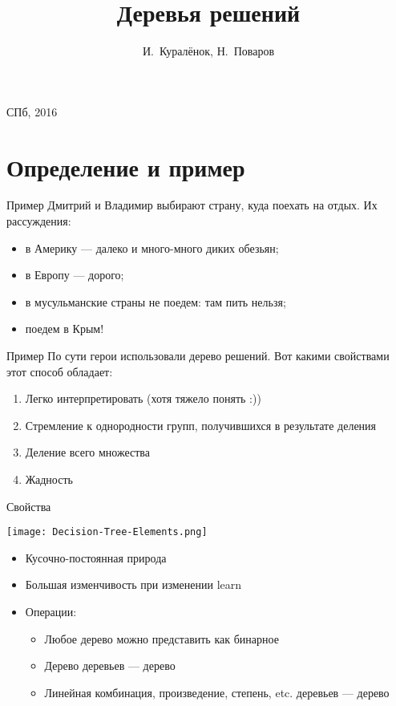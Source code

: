 \documentclass[14pt, fleqn, xcolor={dvipsnames, table}]{beamer}
\title{Деревья решений\\\small{}}
\author[]{\small{%
И.~Куралёнок,
Н.~Поваров}}
\date{}
\begin{document}
\begin{frame}
\maketitle
\small
\begin{center}
\vspace{-60pt}
\vspace{80pt}
\footnotesize СПб, 2016
\end{center}
\end{frame}

\section{Определение и пример}
\begin{frame}{Пример}
Дмитрий и Владимир выбирают страну, куда поехать на отдых. Их рассуждения:
\begin{itemize}
  \item в Америку --- далеко и много-много диких обезьян;
  \item в Европу --- дорого;
  \item в мусульманские страны не поедем: там пить нельзя;
  \item поедем в Крым!
\end{itemize}
\end{frame}

\begin{frame}{Пример}
По сути герои использовали дерево решений. Вот какими свойствами этот способ обладает:
\begin{enumerate}
  \item Легко интерпретировать (хотя тяжело понять :))
  \item Стремление к однородности групп, получившихся в результате деления
  \item Деление всего множества
  \item Жадность
\end{enumerate}
\end{frame}

\begin{frame}{Свойства}
\begin{center}
\texttt{[image: Decision-Tree-Elements.png]}
\end{center}
\small
\begin{itemize}
  \item Кусочно-постоянная природа
  \item Большая изменчивость при изменении learn
  \item Операции:
  \begin{itemize}
    \item Любое дерево можно представить как бинарное
    \item Дерево деревьев --- дерево
    \item Линейная комбинация, произведение, степень, etc. деревьев --- дерево
  \end{itemize}
\end{itemize}
\end{frame}
\end{document}

